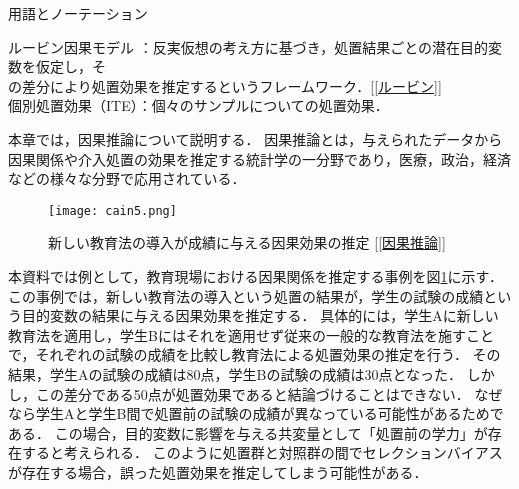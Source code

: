 \documentclass[dvipdfmx]{jreport}
\begin{document}
\begin{itembox}[l]{\large{用語とノーテーション}}
\begin{tabbing}
        \hspace{15pt} \raisebox{0.5ex}{\tiny $\bullet$} ルービン因果モデル \>：反実仮想の考え方に基づき，処置結果ごとの潜在目的変数を仮定し，そ\\[0.5em]\>\hspace{6.5pt}の差分により処置効果を推定するというフレームワーク．[\ref{ルービン}]\\[0.5em]
        \hspace{15pt} \raisebox{0.5ex}{\tiny $\bullet$} 個別処置効果（ITE）\>：個々のサンプルについての処置効果．
    \end{tabbing}
\end{itembox}

本章では，因果推論について説明する．
因果推論とは，与えられたデータから因果関係や介入処置の効果を推定する統計学の一分野であり，医療，政治，経済などの様々な分野で応用されている．

\begin{figure}[h]
    \begin{center}
        \texttt{[image: cain5.png]}
    \end{center}
    \caption{新しい教育法の導入が成績に与える因果効果の推定 [\ref{因果推論}]} \label{fig:因果推論}
\end{figure}

本資料では例として，教育現場における因果関係を推定する事例を図\ref{fig:因果推論}に示す．
この事例では，新しい教育法の導入という処置の結果が，学生の試験の成績という目的変数の結果に与える因果効果を推定する．
具体的には，学生Aに新しい教育法を適用し，学生Bにはそれを適用せず従来の一般的な教育法を施すことで，それぞれの試験の成績を比較し教育法による処置効果の推定を行う．
その結果，学生Aの試験の成績は80点，学生Bの試験の成績は30点となった．
しかし，この差分である50点が処置効果であると結論づけることはできない．
なぜなら学生Aと学生B間で処置前の試験の成績が異なっている可能性があるためである．
この場合，目的変数に影響を与える共変量として「処置前の学力」が存在すると考えられる．
このように処置群と対照群の間でセレクションバイアスが存在する場合，誤った処置効果を推定してしまう可能性がある．
\end{document}
